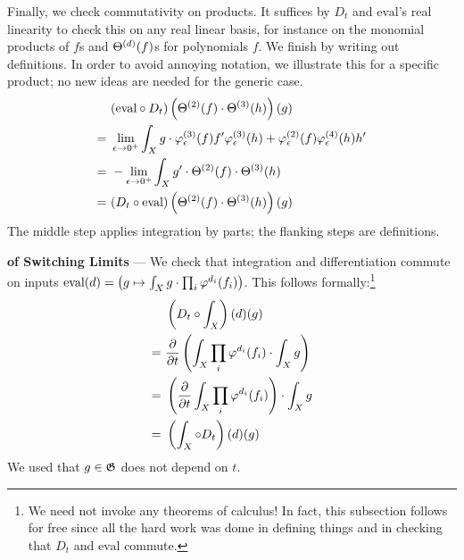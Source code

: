     Finally, we check commutativity on products.  It suffices by $D_t$ and
    $\text{eval}$'s real linearity to check this on any real linear basis,
    for instance on the monomial products of $f$s and $\Theta^{(d)}(f)$s for
    polynomials $f$.  We finish by writing out definitions.  In order to avoid
    annoying notation, we illustrate this for a specific product; no new ideas
    are needed for the generic case.
    \begin{align*}
        &~(\text{eval}\circ D_t)\left(
            \Theta^{(2)}(f)
            \cdot
            \Theta^{(3)}(h)
        \right)(g)
        \\
        =
        &~\lim_{\epsilon\to 0^+}
            \int_X g \cdot
            \varphi_\epsilon^{(3)}(f) f^\prime \varphi_\epsilon^{(3)}(h)
            +
            \varphi_\epsilon^{(2)}(f) \varphi_\epsilon^{(4)}(h) h^\prime
        \\
        =
        &~-\lim_{\epsilon\to 0^+}
            \int_X g^\prime \cdot
            \Theta^{(2)}(f)
            \cdot
            \Theta^{(3)}(h)
        \\
        =
        &~(D_t \circ \text{eval})\left(
            \Theta^{(2)}(f)
            \cdot
            \Theta^{(3)}(h)
        \right)(g)
    \end{align*}
    The middle step applies integration by parts; the flanking
    steps are definitions.
    
    \textbf{of Switching Limits} ---
    We check that integration and differentiation commute on inputs
    $\text{eval}(d) = \left(g \mapsto \int_X g \cdot \prod_i \varphi^{d_i}(f_i)\right)$.
    This follows formally:\footnote{
        We need not invoke any theorems of calculus!  In fact, this
        subsection follows for free since all the hard work was dome in
        defining things and in checking that $D_t$ and $\text{eval}$ commute.
    }
    \begin{align*}
        &~\left(D_t \circ \int_X\right)(d)(g) 
        \\
        = 
        &~\frac{\partial}{\partial t} \left(
            \int_X \prod_i \varphi^{d_i}(f_i)
            \cdot \int_X g
        \right) 
        \\
        = 
        &~\left(
            \frac{\partial}{\partial t} \int_X \prod_i \varphi^{d_i}(f_i)
        \right) \cdot \int_X g
        \\
        =
        &~\left(\int_X \circ D_t\right)(d)(g) 
    \end{align*}
    We used that $g\in\frak G$ does not depend on $t$.

